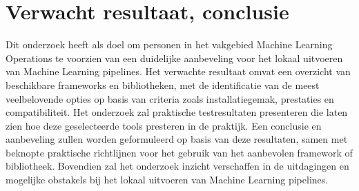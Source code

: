 




\section{Verwacht resultaat, conclusie}%
\label{sec:verwachte_resultaten}
Dit onderzoek heeft als doel om personen in het vakgebied Machine Learning Operations te voorzien van een duidelijke aanbeveling voor het lokaal uitvoeren van Machine Learning pipelines. Het verwachte resultaat omvat een overzicht van beschikbare frameworks en bibliotheken, met de identificatie van de meest veelbelovende opties op basis van criteria zoals installatiegemak, prestaties en compatibiliteit. Het onderzoek zal praktische testresultaten presenteren die laten zien hoe deze geselecteerde tools presteren in de praktijk. Een conclusie en aanbeveling zullen worden geformuleerd op basis van deze resultaten, samen met beknopte praktische richtlijnen voor het gebruik van het aanbevolen framework of bibliotheek. Bovendien zal het onderzoek inzicht verschaffen in de uitdagingen en mogelijke obstakels bij het lokaal uitvoeren van Machine Learning pipelines.

